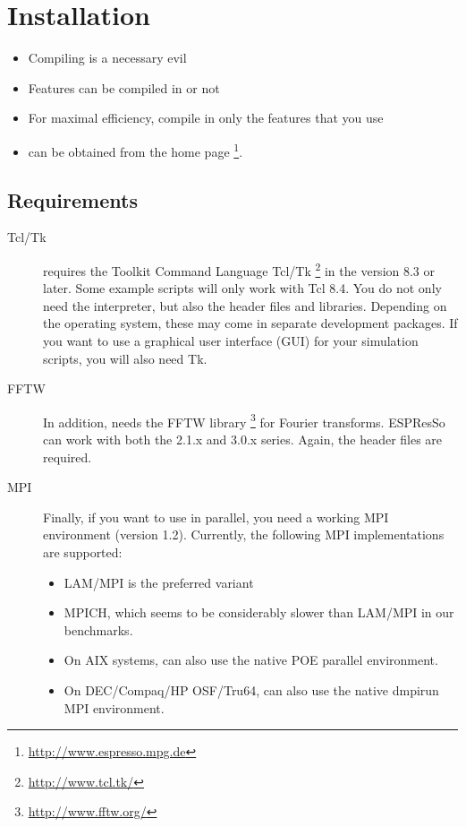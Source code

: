 \chapter{Installation}
\label{chap:install}

\begin{itemize}
\item Compiling \es{} is a necessary evil
\item Features can be compiled in or not
\item For maximal efficiency, compile in only the features that you
  use
\item \es{} can be obtained from the \es{} home page
  \footnote{\url{http://www.espresso.mpg.de}}.
\end{itemize}

\section{Requirements}
\label{sec:requirements}

\begin{description}
\item[Tcl/Tk]  \es{} requires the Toolkit Command
  Language Tcl/Tk \footnote{\url{http://www.tcl.tk/}} in the version
  8.3 or later.  Some example scripts will only work with Tcl 8.4. You
  do not only need the interpreter, but also the header files and
  libraries.  Depending on the operating system, these may come in
  separate development packages. If you want to use a graphical user
  interface (GUI) for your simulation scripts, you will also need Tk.
  
\item[FFTW]  In addition, \es{} needs the FFTW library
  \footnote{\url{http://www.fftw.org/}} for Fourier transforms.
  ESPResSo can work with both the 2.1.x and 3.0.x series. Again, the
  header files are required.
  
\item[MPI]  Finally, if you want to use \es{} in parallel,
  you need a working MPI environment (version 1.2). Currently, the
  following MPI implementations are supported:
  \begin{itemize}
  \item LAM/MPI is the preferred variant
  \item MPICH, which seems to be considerably slower than LAM/MPI in
    our benchmarks.
  \item On AIX systems, \es{} can also use the native POE parallel
    environment.
  \item On DEC/Compaq/HP OSF/Tru64, \es{} can also use the native
    dmpirun MPI environment.
  \end{itemize}
\end{description}

